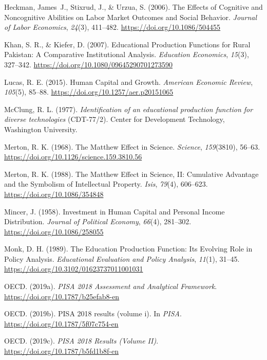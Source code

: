 \documentclass[
]{article}
\newlength{\cslhangindent}
\newenvironment{CSLReferences}[2] %
 {\begin{list}{}{%
  \setlength{\itemindent}{0pt}
  \setlength{\leftmargin}{0pt}
  \setlength{\parsep}{0pt}
  \ifodd #1
   \setlength{\leftmargin}{\cslhangindent}
   \setlength{\itemindent}{-1\cslhangindent}
  \fi
  \setlength{\itemsep}{#2\baselineskip}}}
 {\end{list}}
\begin{document}
\begin{CSLReferences}{1}{0}
Heckman, James~J., Stixrud, J., \& Urzua, S. (2006). The Effects of
Cognitive and Noncognitive Abilities on Labor Market Outcomes and Social
Behavior. \emph{Journal of Labor Economics}, \emph{24}(3), 411--482.
\url{https://doi.org/10.1086/504455}

Khan, S. R., \& Kiefer, D. (2007). Educational Production Functions for
Rural Pakistan: A Comparative Institutional Analysis. \emph{Education
Economics}, \emph{15}(3), 327--342.
\url{https://doi.org/10.1080/09645290701273590}

Lucas, R. E. (2015). Human Capital and Growth. \emph{American Economic
Review}, \emph{105}(5), 85--88.
\url{https://doi.org/10.1257/aer.p20151065}

McClung, R. L. (1977). \emph{Identification of an educational production
function for diverse technologies} (CDT-77/2). Center for Development
Technology, Washington University.

Merton, R. K. (1968). The Matthew Effect in Science. \emph{Science},
\emph{159}(3810), 56--63.
\url{https://doi.org/10.1126/science.159.3810.56}

Merton, R. K. (1988). The Matthew Effect in Science, II: Cumulative
Advantage and the Symbolism of Intellectual Property. \emph{Isis},
\emph{79}(4), 606--623. \url{https://doi.org/10.1086/354848}

Mincer, J. (1958). Investment in Human Capital and Personal Income
Distribution. \emph{Journal of Political Economy}, \emph{66}(4),
281--302. \url{https://doi.org/10.1086/258055}

Monk, D. H. (1989). The Education Production Function: Its Evolving Role
in Policy Analysis. \emph{Educational Evaluation and Policy Analysis},
\emph{11}(1), 31--45. \url{https://doi.org/10.3102/01623737011001031}

OECD. (2019a). \emph{PISA 2018 Assessment and Analytical Framework}.
\url{https://doi.org/10.1787/b25efab8-en}

OECD. (2019b). PISA 2018 results (volume i). In \emph{PISA}.
\url{https://doi.org/10.1787/5f07c754-en}

OECD. (2019c). \emph{PISA 2018 Results (Volume II)}.
\url{https://doi.org/10.1787/b5fd1b8f-en}


\end{CSLReferences}
\end{document}
